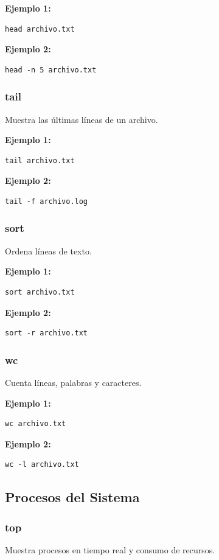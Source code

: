 \documentclass[12pt,a4paper]{article}
\begin{document}
\textbf{Ejemplo 1:}
\begin{lstlisting}
head archivo.txt
\end{lstlisting}

\textbf{Ejemplo 2:}
\begin{lstlisting}
head -n 5 archivo.txt
\end{lstlisting}


\subsubsection{tail}
Muestra las últimas líneas de un archivo.

\textbf{Ejemplo 1:}
\begin{lstlisting}
tail archivo.txt
\end{lstlisting}

\textbf{Ejemplo 2:}
\begin{lstlisting}
tail -f archivo.log
\end{lstlisting}


\subsubsection{sort}
Ordena líneas de texto.

\textbf{Ejemplo 1:}
\begin{lstlisting}
sort archivo.txt
\end{lstlisting}

\textbf{Ejemplo 2:}
\begin{lstlisting}
sort -r archivo.txt
\end{lstlisting}


\subsubsection{wc}
Cuenta líneas, palabras y caracteres.

\textbf{Ejemplo 1:}
\begin{lstlisting}
wc archivo.txt
\end{lstlisting}

\textbf{Ejemplo 2:}
\begin{lstlisting}
wc -l archivo.txt
\end{lstlisting}


\subsection{Procesos del Sistema}

\subsubsection{top}
Muestra procesos en tiempo real y consumo de recursos.
\end{document}
